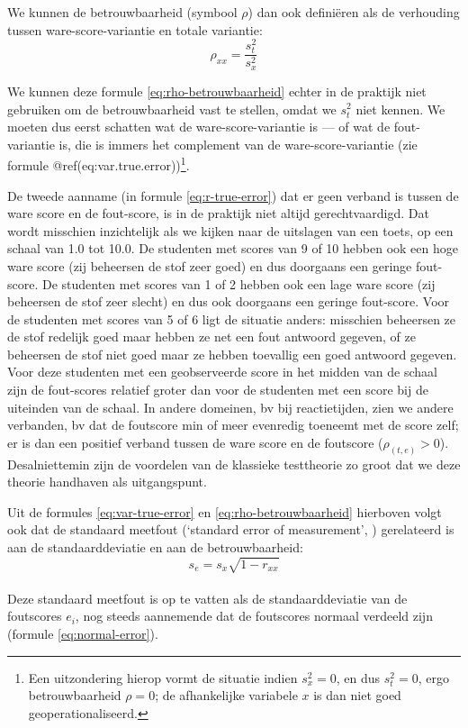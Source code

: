 \documentclass[
]{book}
\begin{document}
We kunnen de betrouwbaarheid (symbool \(\rho\)) dan ook definiëren als de
verhouding tussen ware-score-variantie en totale variantie:
\begin{equation}
  \label{eq:rho-betrouwbaarheid}
  \rho_{xx} = \frac{s^2_t}{s^2_x}
\end{equation}

We kunnen deze formule \eqref{eq:rho-betrouwbaarheid} echter in de praktijk niet gebruiken
om de betrouwbaarheid vast te stellen, omdat we \(s^2_t\) niet kennen. We
moeten dus eerst schatten wat de ware-score-variantie is --- of wat de
fout-variantie is, die is immers het complement van de
ware-score-variantie (zie
formule @ref(eq:var.true.error))\footnote{Een uitzondering hierop vormt de situatie indien \(s^2_x=0\), en dus \(s^2_t=0\), ergo betrouwbaarheid \(\rho=0\); de afhankelijke variabele \(x\) is dan niet goed geoperationaliseerd.}.

De tweede aanname (in formule \eqref{eq:r-true-error}) dat er geen verband is tussen de ware
score en de fout-score, is in de praktijk niet altijd gerechtvaardigd.
Dat wordt misschien inzichtelijk als we kijken naar de uitslagen van een
toets, op een schaal van 1.0 tot 10.0. De studenten met scores van 9 of
10 hebben ook een hoge ware score (zij beheersen de stof zeer goed) en
dus doorgaans een geringe fout-score. De studenten met scores van 1 of 2
hebben ook een lage ware score (zij beheersen de stof zeer slecht) en
dus ook doorgaans een geringe fout-score. Voor de studenten met scores
van 5 of 6 ligt de situatie anders: misschien beheersen ze de stof
redelijk goed maar hebben ze net een fout antwoord gegeven, of ze
beheersen de stof niet goed maar ze hebben toevallig een goed antwoord
gegeven. Voor deze studenten met een geobserveerde score in het midden
van de schaal zijn de fout-scores relatief groter dan voor de studenten
met een score bij de uiteinden van de schaal. In andere domeinen, bv bij
reactietijden, zien we andere verbanden, bv dat de foutscore min of meer
evenredig toeneemt met de score zelf; er is dan een positief verband
tussen de ware score en de foutscore (\(\rho_{(t,e)}>0\)). Desalniettemin
zijn de voordelen van de klassieke testtheorie zo groot dat we deze
theorie handhaven als uitgangspunt.

Uit de formules \eqref{eq:var-true-error} en \eqref{eq:rho-betrouwbaarheid}
hierboven volgt ook dat de standaard
meetfout (`standard error of measurement', ) gerelateerd is aan de
standaarddeviatie en aan de betrouwbaarheid:
\begin{equation}
   \label{eq:standaard-meetfout}
    s_e = s_x \sqrt{1-r_{xx}}
\end{equation}\\
Deze standaard meetfout is op te vatten
als de standaarddeviatie van de foutscores \(e_i\), nog steeds aannemende
dat de foutscores normaal verdeeld zijn (formule \eqref{eq:normal-error}).
\end{document}
